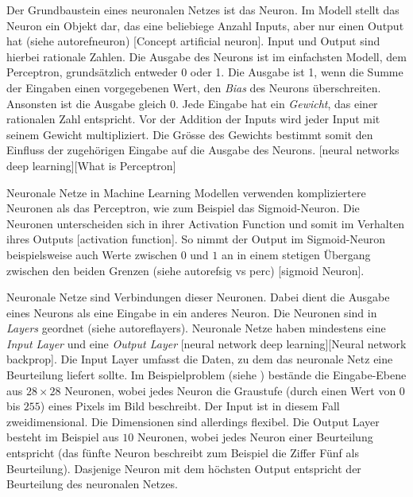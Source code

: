Der Grundbaustein eines neuronalen Netzes ist das Neuron. Im Modell stellt das
Neuron ein Objekt dar, das eine beliebiege Anzahl Inputs, aber nur einen Output
hat (siehe autoref{neuron}) [Concept artificial neuron]. Input und Output sind
hierbei rationale Zahlen. Die Ausgabe des Neurons ist im einfachsten Modell, dem
Perceptron, grundsätzlich entweder 0 oder 1. Die Ausgabe ist 1, wenn die Summe
der Eingaben einen vorgegebenen Wert, den \emph{Bias} des Neurons überschreiten.
Ansonsten ist die Ausgabe gleich 0. Jede Eingabe hat ein \emph{Gewicht}, das
einer rationalen Zahl entspricht. Vor der Addition der Inputs wird jeder Input
mit seinem Gewicht multipliziert.  Die Grösse des Gewichts bestimmt somit den
Einfluss der zugehörigen Eingabe auf die Ausgabe des Neurons. [neural networks
deep learning][What is Perceptron]


Neuronale Netze in Machine Learning Modellen verwenden kompliziertere Neuronen
als das Perceptron, wie zum Beispiel das Sigmoid-Neuron. Die Neuronen
unterscheiden sich in ihrer Activation Function und somit im Verhalten ihres
Outputs [activation function]. So nimmt der Output im Sigmoid-Neuron
beispielsweise auch Werte zwischen $0$ und $1$ an in einem stetigen Übergang
zwischen den beiden Grenzen (siehe autoref{sig vs perc}) [sigmoid Neuron].


Neuronale Netze sind Verbindungen dieser Neuronen. Dabei dient die Ausgabe eines
Neurons als eine Eingabe in ein anderes Neuron. Die Neuronen sind in
\emph{Layers} geordnet (siehe autoref{layers}). Neuronale Netze haben mindestens
eine \emph{Input Layer} und eine \emph{Output Layer} [neural network deep
learning][Neural network backprop]. Die Input Layer umfasst die Daten, zu dem das
neuronale Netz eine Beurteilung liefert sollte. Im Beispielproblem (siehe
) bestände die Eingabe-Ebene aus $28\times28$ Neuronen, wobei
jedes Neuron die Graustufe (durch einen Wert von $0$ bis $255$) eines Pixels im
Bild beschreibt. Der Input ist in diesem Fall zweidimensional. Die Dimensionen
sind allerdings flexibel. Die Output Layer besteht im Beispiel aus $10$
Neuronen, wobei jedes Neuron einer Beurteilung entspricht (das fünfte Neuron
beschreibt zum Beispiel die Ziffer Fünf als Beurteilung). Dasjenige Neuron mit
dem höchsten Output entspricht der Beurteilung des neuronalen Netzes.


